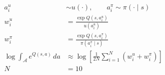 \documentclass[border=7pt]{standalone}
\begin{document}
\color{ink}
$\displaystyle \begin{aligned} a_i^u&\sim u(\cdot),\qquad a_i^\pi\sim\pi(\cdot\mid s)\\ w_i^u&=\frac{\exp Q(s,a_i^u)}{u(a_i^u)}\\ w_i^\pi&=\frac{\exp Q(s,a_i^\pi)}{\pi(a_i^\pi\mid s)}\\ \log\!\int_{\mathcal A}e^{Q(s,a)}\,da&\approx\log\!\left[\frac1{2N}\sum_{i=1}^N(w_i^u+w_i^\pi)\right]\\ N&=10\end{aligned}$
\end{document}
